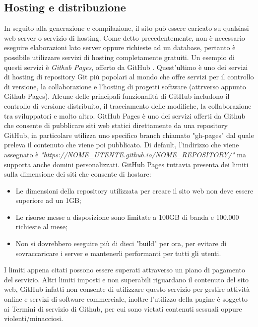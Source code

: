 \documentclass[target=bach,aauheader=]{thud}
\begin{document}
\subsection{Hosting e distribuzione}\label{subsec:hosting}
In seguito alla generazione e compilazione, il sito può essere caricato su qualsiasi web server o servizio di hosting. Come detto precedentemente, non è necessario eseguire elaborazioni lato server oppure richieste ad un database, pertanto è possibile utilizzare servizi di hosting completamente gratuiti.
\newline
Un esempio di questi servizi è \textit{Github Pages}, offerto da GitHub \cite{github-pages}. Quest'ultimo è uno dei servizi di hosting di repository Git più popolari al mondo che offre servizi per il controllo di versione, la collaborazione e l'hosting di progetti software (attrverso appunto Github Pages).
Alcune delle principali funzionalità di GitHub includono il controllo di versione distribuito, il tracciamento delle modifiche, la collaborazione tra sviluppatori e molto altro.
GitHub Pages è uno dei servizi offerti da Github che consente di pubblicare siti web statici direttamente da una repository GitHub, in particolare utilizza uno specifico branch chiamato "gh-pages" dal quale preleva il contenuto che viene poi pubblicato.
Di default, l'indirizzo che viene assegnato è \textit{"https://NOME\_UTENTE.github.io/NOME\_REPOSITORY/"} ma supporta anche domini personalizzati. 
\newline 
GitHub Pages tuttavia presenta dei limiti sulla dimensione dei siti che consente di hostare:
\begin{itemize}
    \item Le dimensioni della repository utilizzata per creare il sito web non deve essere superiore ad un 1GB;
    \item Le risorse messe a disposizione sono limitate a 100GB di banda e 100.000 richieste al mese;
    \item Non si dovrebbero eseguire più di dieci "build" per ora, per evitare di sovraccaricare i server e mantenerli performanti per tutti gli utenti.
\end{itemize}
I limiti appena citati possono essere superati attraverso un piano di pagamento del servizio.
\newline
Altri limiti imposti e non superabili riguardano il contenuto del sito web, GitHub infatti non consente di utilizzare questo servizio per gestire attività online e servizi di software commerciale, inoltre l'utilizzo della pagine è soggetto ai Termini di servizio di Github,
per cui sono vietati contenuti sessuali oppure violenti/minacciosi. 
\end{document}
